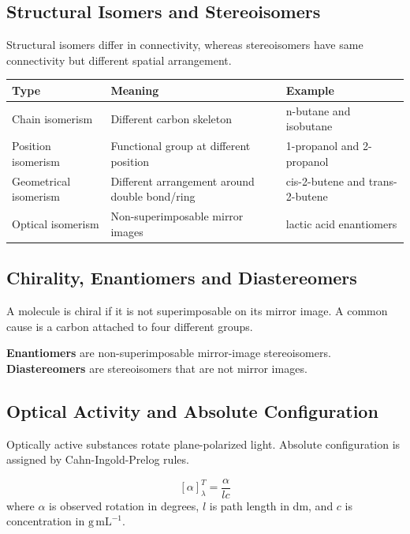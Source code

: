 \documentclass[12pt,a4paper]{article}
\begin{document}
\subsection{Structural Isomers and Stereoisomers}
Structural isomers differ in connectivity, whereas stereoisomers have same connectivity but different spatial arrangement.

\begin{tabularx}{\linewidth}{|B{3cm}|Y|Y|}
\hline
\textbf{Type} & \textbf{Meaning} & \textbf{Example} \\
\hline
Chain isomerism & Different carbon skeleton & n-butane and isobutane \\
\hline
Position isomerism & Functional group at different position & 1-propanol and 2-propanol \\
\hline
Geometrical isomerism & Different arrangement around double bond/ring & cis-2-butene and trans-2-butene \\
\hline
Optical isomerism & Non-superimposable mirror images & lactic acid enantiomers \\
\hline
\end{tabularx}

\subsection{Chirality, Enantiomers and Diastereomers}
A molecule is chiral if it is not superimposable on its mirror image. A common cause is a carbon attached to four different groups.

\begin{tcolorbox}[defbox]
\textbf{Enantiomers} are non-superimposable mirror-image stereoisomers. \textbf{Diastereomers} are stereoisomers that are not mirror images.
\end{tcolorbox}

\subsection{Optical Activity and Absolute Configuration}
Optically active substances rotate plane-polarized light. Absolute configuration is assigned by Cahn-Ingold-Prelog rules.

\begin{tcolorbox}[formulabox, title={Specific Rotation}]
\[
[\alpha]_{\lambda}^{T}=\frac{\alpha}{lc}
\]
where $\alpha$ is observed rotation in degrees, $l$ is path length in dm, and $c$ is concentration in $\mathrm{g\,mL^{-1}}$.
\end{tcolorbox}
\end{document}
